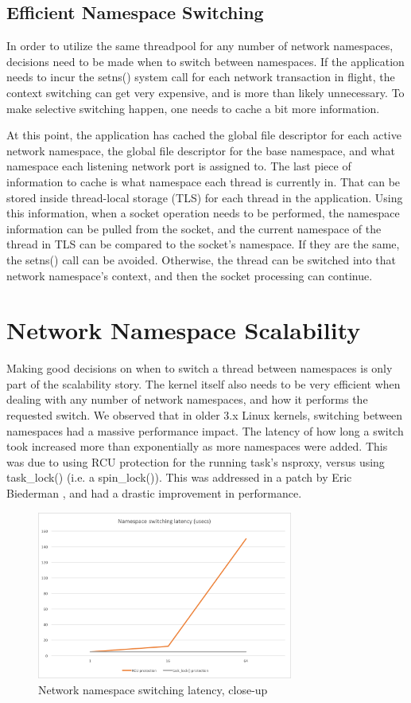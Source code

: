 \documentclass[letterpaper]{article}
\begin{document}
\subsection{Efficient Namespace Switching}
In order to utilize the same threadpool for any number of network namespaces, decisions need to be made when to switch between namespaces. If the application needs to incur the setns() system call for each network transaction in flight, the context switching can get very expensive, and is more than likely unnecessary. To make selective switching happen, one needs to cache a bit more information.

At this point, the application has cached the global file descriptor for each active network namespace, the global file descriptor for the base namespace, and what namespace each listening network port is assigned to. The last piece of information to cache is what namespace each thread is currently in. That can be stored inside thread-local storage (TLS) for each thread in the application. Using this information, when a socket operation needs to be performed, the namespace information can be pulled from the socket, and the current namespace of the thread in TLS can be compared to the socket's namespace. If they are the same, the setns() call can be avoided. Otherwise, the thread can be switched into that network namespace's context, and then the socket processing can continue.

\section{Network Namespace Scalability}
Making good decisions on when to switch a thread between namespaces is only part of the scalability story. The kernel itself also needs to be very efficient when dealing with any number of network namespaces, and how it performs the requested switch. We observed that in older 3.x Linux kernels, switching between namespaces had a massive performance impact. The latency of how long a switch took increased more than exponentially as more namespaces were added.  This was due to using RCU protection for the running task's nsproxy, versus using task\_lock() (i.e. a spin\_lock()). This was addressed in a patch by Eric Biederman \cite{biederman2014}, and had a drastic improvement in performance.

\begin{figure}[h]
\includegraphics[width=3.31in]{close-up-latency.png}
\caption{Network namespace switching latency, close-up}
\label{close-latency}
\end{figure}
\end{document}
